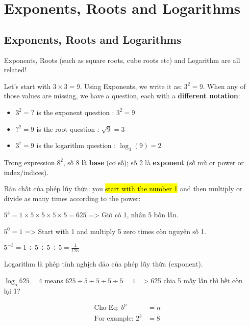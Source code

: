 \chapter{Exponents, Roots and Logarithms}

\section{Exponents, Roots and Logarithms}

Exponents, Roots (such as square roots, cube roots etc) and Logarithm are all related!

Let's start with $3\times 3=9$. Using Exponents, we write it as: $3^{2}=9$. When any of those values are missing, we have a question, each with a \textbf{different notation}:

\begin{itemize}
  \item $3^{2}=?$ is the exponent question : $3^{2}=9$
  \item $?^{2}=9$ is the root question : $\sqrt{9}=3$
  \item $3^{?}=9$ is the logarithm question : $\log_3 (9)=2$
\end{itemize}

\vspace{6 mm}

Trong expression \(8^{2}\), số 8 là \textbf{base} (cơ số); số 2 là \textbf{exponent} (số mũ or power or index/indices).

Bản chất của phép lũy thừa: you \hl{start with the number 1} and then multiply or divide as many times according to the power:

\(5^{4}= 1 \times 5 \times 5 \times 5 \times 5=625\) => Giờ có 1, nhân 5 bốn lần.

$5^{0}=1$ => Start with 1 and multiply 5 zero times còn nguyên số 1.

$5^{-3}=1\div 5\div 5\div 5=\frac{1}{125}$

\vspace{.5cm}

Logarithm là phép tính nghịch đảo của phép lũy thừa (exponent).

\(\log_5 625=4\) means \(625 \div 5 \div 5 \div 5 \div 5=1\) => 625 chia 5 mấy lần thì hết còn lại 1?

\vspace{6 mm}

\begin{equation*}
  \begin{split}
    \text{Cho Eq: } b^{p}&=n\\
    \text{For example: } 2^{3}&=8
  \end{split}
  \label{exponent_eqn}
\end{equation*}

